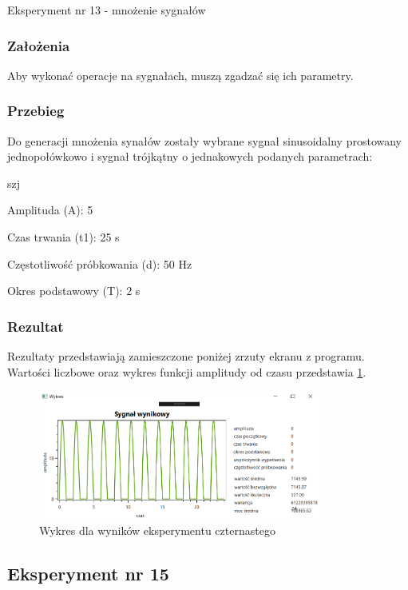 \documentclass[12pt]{article}
\begin{document}
Eksperyment nr 13 - mnożenie sygnałów

\subsubsection{Założenia}
Aby wykonać operacje na sygnałach, muszą zgadzać się ich parametry.

\subsubsection{Przebieg}
Do generacji mnożenia synałów zostały wybrane sygnał sinusoidalny prostowany jednopołówkowo i sygnał trójkątny o jednakowych podanych parametrach:

\begin{labeling}{szj}
\item [Amplituda (A):] 5
\item [Czas trwania (t1):] 25 s
\item [Częstotliwość próbkowania (d): ] 50 Hz
\item [Okres podstawowy (T):] 2 s
\end{labeling}

\subsubsection{Rezultat}
Rezultaty przedstawiają zamieszczone poniżej zrzuty ekranu z programu. Wartości liczbowe oraz wykres funkcji amplitudy od czasu przedstawia \ref{Wykres dla wyników eksperymentu czternastego}.
\begin{figure}[h!]
 \centering
 \includegraphics[width=9.3cm]{MnozenieSinJedPTrojA5t125d50T2.png}
 \vspace{-0.3cm}
 \caption{Wykres dla wyników eksperymentu czternastego} 
 \label{Wykres dla wyników eksperymentu czternastego}
\end{figure}

\subsection{Eksperyment nr 15}
\end{document}
